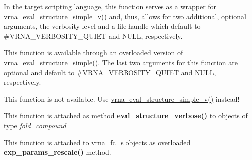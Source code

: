 \begin{DoxyRefList}
\item[\label{wrappers__wrappers000035}%
\Hypertarget{wrappers__wrappers000035}%
Global \hyperlink{group__eval_ga7e5273464b775d4130245681312c1369}{vrna\+\_\+eval\+\_\+structure\+\_\+simple} (const char $\ast$string, const char $\ast$structure)]In the target scripting language, this function serves as a wrapper for \hyperlink{group__eval_gacd6278343e77d13f1d53588e50d303bc}{vrna\+\_\+eval\+\_\+structure\+\_\+simple\+\_\+v()} and, thus, allows for two additional, optional arguments, the verbosity level and a file handle which default to \#\+V\+R\+N\+A\+\_\+\+V\+E\+R\+B\+O\+S\+I\+T\+Y\+\_\+\+Q\+U\+I\+ET and N\+U\+LL, respectively.  
\item[\label{wrappers__wrappers000045}%
\Hypertarget{wrappers__wrappers000045}%
Global \hyperlink{group__eval_gacd6278343e77d13f1d53588e50d303bc}{vrna\+\_\+eval\+\_\+structure\+\_\+simple\+\_\+v} (const char $\ast$string, const char $\ast$structure, int verbosity\+\_\+level, F\+I\+LE $\ast$file)]This function is available through an overloaded version of \hyperlink{group__eval_ga7e5273464b775d4130245681312c1369}{vrna\+\_\+eval\+\_\+structure\+\_\+simple()}. The last two arguments for this function are optional and default to \#\+V\+R\+N\+A\+\_\+\+V\+E\+R\+B\+O\+S\+I\+T\+Y\+\_\+\+Q\+U\+I\+ET and N\+U\+LL, respectively.  
\item[\label{wrappers__wrappers000043}%
\Hypertarget{wrappers__wrappers000043}%
Global \hyperlink{group__eval_gaf928bfd96767e1b8033a95a4cc432e39}{vrna\+\_\+eval\+\_\+structure\+\_\+simple\+\_\+verbose} (const char $\ast$string, const char $\ast$structure, F\+I\+LE $\ast$file)]This function is not available. Use \hyperlink{group__eval_gacd6278343e77d13f1d53588e50d303bc}{vrna\+\_\+eval\+\_\+structure\+\_\+simple\+\_\+v()} instead!  
\item[\label{wrappers__wrappers000027}%
\Hypertarget{wrappers__wrappers000027}%
Global \hyperlink{group__eval_ga0928d699d310178f84ee2351034e5cb5}{vrna\+\_\+eval\+\_\+structure\+\_\+verbose} (vrna\+\_\+fold\+\_\+compound\+\_\+t $\ast$vc, const char $\ast$structure, F\+I\+LE $\ast$file)]This function is attached as method {\bfseries eval\+\_\+structure\+\_\+verbose()} to objects of type {\itshape fold\+\_\+compound}  
\item[\label{wrappers__wrappers000080}%
\Hypertarget{wrappers__wrappers000080}%
Global \hyperlink{group__energy__parameters_gad607bc3a5b5da16400e2ca4ea5560233}{vrna\+\_\+exp\+\_\+params\+\_\+rescale} (vrna\+\_\+fold\+\_\+compound\+\_\+t $\ast$vc, double $\ast$mfe)]This function is attached to \hyperlink{group__fold__compound_structvrna__fc__s}{vrna\+\_\+fc\+\_\+s} objects as overloaded {\bfseries exp\+\_\+params\+\_\+rescale()} method.


\end{DoxyRefList}
